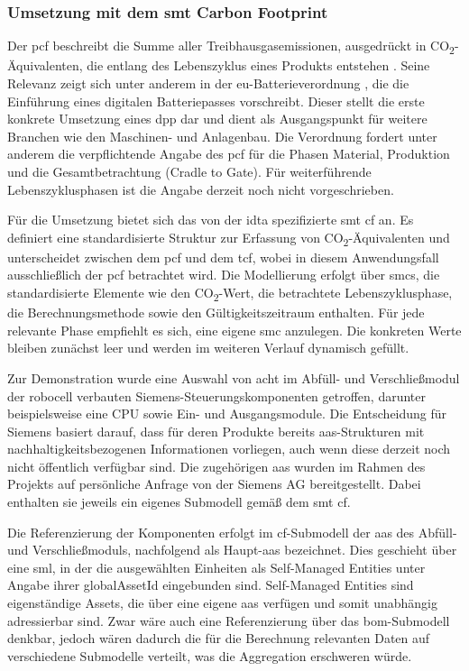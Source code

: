 \subsubsection{Umsetzung mit dem \acs{smt} Carbon Footprint}
Der \acs{pcf} beschreibt die Summe aller Treibhausgasemissionen, ausgedrückt in CO\textsubscript{2}-Äqui\-valenten, die entlang des Lebenszyklus eines Produkts entstehen \cite{PCF}. 
Seine Relevanz zeigt sich unter anderem in der \acs{eu}-Batterieverordnung \cite{EUVerordnung}, die die Einführung eines digitalen Batteriepasses vorschreibt. 
Dieser stellt die erste konkrete Umsetzung eines \acs{dpp} dar und dient als Ausgangspunkt für weitere Branchen wie den Maschinen- und Anlagenbau. 
Die Verordnung fordert unter anderem die verpflichtende Angabe des \acs{pcf} für die Phasen Material, Produktion und die Gesamtbetrachtung (Cradle to Gate). 
Für weiterführende Lebenszyklusphasen ist die Angabe derzeit noch nicht vorgeschrieben.

Für die Umsetzung bietet sich das von der \acs{idta} spezifizierte \acs{smt} \acs{cf} \cite{SpezifikaitonPCF} an.
Es definiert eine standardisierte Struktur zur Erfassung von CO\textsubscript{2}-Äquivalenten und unterscheidet zwischen dem \acs{pcf} und dem \ac{tcf}, wobei in diesem Anwendungsfall ausschließlich der \acs{pcf} betrachtet wird.
Die Modellierung erfolgt über \acsp{smc}, die standardisierte Elemente wie den CO\textsubscript{2}-Wert, die betrachtete Lebenszyklusphase, die Berechnungsmethode sowie den Gültigkeitszeitraum enthalten.
Für jede relevante Phase empfiehlt es sich, eine eigene \acs{smc} anzulegen.
Die konkreten Werte bleiben zunächst leer und werden im weiteren Verlauf dynamisch gefüllt.

Zur Demonstration wurde eine Auswahl von acht im Abfüll- und Verschließmodul der robocell verbauten Siemens-Steuerungskomponenten getroffen, darunter beispielsweise eine CPU sowie Ein- und Ausgangsmodule.
Die Entscheidung für Siemens basiert darauf, dass für deren Produkte bereits \acs{aas}-Strukturen mit nachhaltigkeitsbezogenen Informationen vorliegen, auch wenn diese derzeit noch nicht öffentlich verfügbar sind.
Die zugehörigen \acs{aas} wurden im Rahmen des Projekts auf persönliche Anfrage von der Siemens AG bereitgestellt. 
Dabei enthalten sie jeweils ein eigenes Submodell gemäß dem \acs{smt} \acs{cf}.

\clearpage
Die Referenzierung der Komponenten erfolgt im \acs{cf}-Submodell der \acs{aas} des Abfüll- und Verschließmoduls, nachfolgend als Haupt-\acs{aas} bezeichnet.
Dies geschieht über eine \acs{sml}, in der die ausgewählten Einheiten als Self-Managed Entities unter Angabe ihrer globalAssetId eingebunden sind.
Self-Managed Entities sind eigenständige Assets, die über eine eigene \acs{aas} verfügen und somit unabhängig adressierbar sind.
Zwar wäre auch eine Referenzierung über das \acs{bom}-Submodell denkbar, jedoch wären dadurch die für die Berechnung relevanten Daten auf verschiedene Submodelle verteilt, was die Aggregation erschweren würde.

